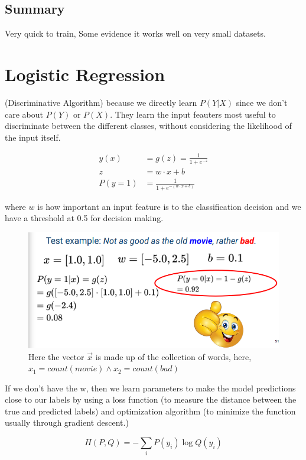 \documentclass[11pt]{article}
\begin{document}
\subsection{Summary}

Very quick to train, Some evidence it works well on very small datasets.

\section{Logistic Regression}

(Discriminative Algorithm) because we directly learn $P(Y|X)$ since we don't care about $P(Y)$ or $P(X)$. They learn the input feauters most useful to discriminate between the different classes, without considering the likelihood of the input itself.

\begin{align*}
    y(x) & = g(z) = \frac 1 {1 + e^{-z}} \\
    z & = w \cdot x + b \\
    P(y=1) & = \frac{1 } {1 + e^{- (w \cdot x + b)}}
\end{align*}

where $w$ is how important an input feature is to the classification decision and we have a threshold at 0.5 for decision making.

\begin{figure}[H]
    \centering
    \includegraphics[trim={0.7cm 0 0 0}, clip, width=.6\linewidth]{figures/example2.png}
    \caption{Here the vector $\vec{x}$ is made up of the collection of words, here, $x_1=count(movie) \wedge x_2=count(bad)$}
\end{figure}

If we don't have the w, then we learn parameters to make the model predictions close to our labels by using a loss function (to measure the distance between the true and predicted labels) and optimization algorithm (to minimize the function usually through gradient descent.)

\begin{definition}
    \begin{equation*}
        H(P,Q) = -\sum_i P(y_i)\log Q(y_i)
    \end{equation*}
\end{definition}
\end{document}

